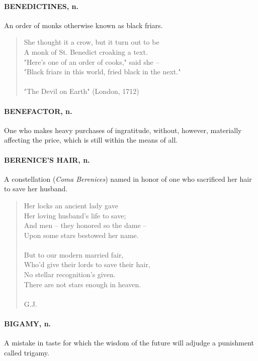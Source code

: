 \documentclass[11pt]{article}
\begin{document}
\paragraph{BENEDICTINES, n.}  An order of monks otherwise known as black friars.

\begin{quote}   She thought it a crow, but it turn out to be \\
      A monk of St. Benedict croaking a text. \\
  "Here's one of an order of cooks," said she -- \\
      "Black friars in this world, fried black in the next." \\
 \\
"The Devil on Earth" (London, 1712) \end{quote}


\paragraph{BENEFACTOR, n.}  One who makes heavy purchases of ingratitude, without,
however, materially affecting the price, which is still within the
means of all.

\paragraph{BERENICE'S HAIR, n.}  A constellation ({\em Coma Berenices}) named in honor
of one who sacrificed her hair to save her husband.

\begin{quote}   Her locks an ancient lady gave \\
  Her loving husband's life to save; \\
  And men -- they honored so the dame -- \\
  Upon some stars bestowed her name. \\
 \\
  But to our modern married fair, \\
  Who'd give their lords to save their hair, \\
  No stellar recognition's given. \\
  There are not stars enough in heaven. \\
 \\
G.J. \end{quote}


\paragraph{BIGAMY, n.}  A mistake in taste for which the wisdom of the future will
adjudge a punishment called trigamy.
\end{document}
